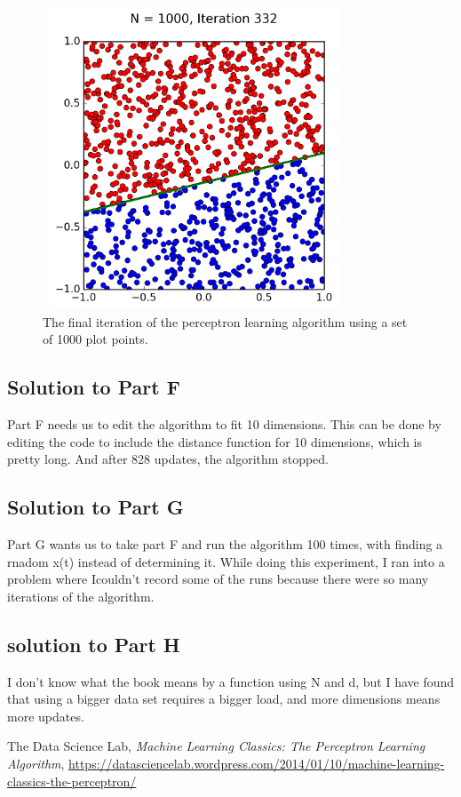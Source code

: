 \documentclass[a4paper]{article}
\begin{document}
\begin{figure}
  \includegraphics[width=9cm,height=9cm]{p_N1000_it332.png}
  \caption{The final iteration of the perceptron learning algorithm using a set of 1000 plot points.}
  \label{fig:PartE3}
\end{figure}

\subsection{Solution to Part F}
Part F needs us to edit the algorithm to fit 10 dimensions. This can be done by editing the code to include the distance function for 10 dimensions, which is pretty long. And after 828 updates, the algorithm stopped.

\subsection{Solution to Part G}
Part G wants us to take part F and run the algorithm 100 times, with finding a rnadom x(t) instead of determining it. While doing this experiment, I ran into a problem where Icouldn't record some of the runs because there were so many iterations of the algorithm.

\subsection{solution to Part H}
I don't know what the book means by a function using N and d, but I have found that using a bigger data set requires a bigger load, and more dimensions means more updates.

\begin{thebibliography}{9}

  The Data Science Lab,
  \emph{Machine Learning Classics: The Perceptron Learning Algorithm},
   \url{https://datasciencelab.wordpress.com/2014/01/10/machine-learning-classics-the-perceptron/}

\end{thebibliography}
\end{document}
